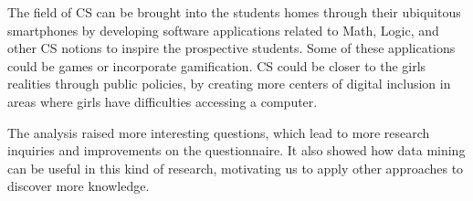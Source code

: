 The field of CS can be brought into the students homes through their ubiquitous smartphones by developing software applications related to Math, Logic, and other CS notions to inspire the prospective students. Some of these  applications could be games or incorporate gamification. CS could be closer to the girls realities through public policies, by creating more centers of digital inclusion in areas where girls have difficulties accessing a computer.

The analysis raised more interesting questions, which lead to more research inquiries and improvements on the questionnaire. It also showed how data mining can be useful in this kind of research, motivating us to apply other approaches to discover more knowledge.